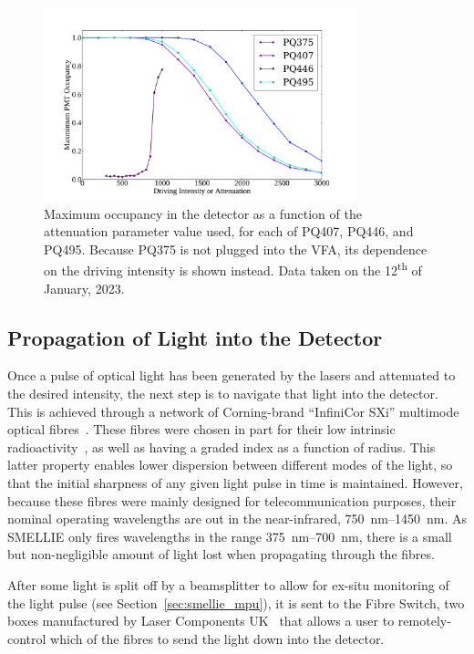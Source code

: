 \begin{figure}
    \centering
    \includegraphics[width=0.8\textwidth]{3_SMELLIEHardware/images/smellie_intensity_scan_new.pdf}
    \caption[Maximum occupancy in the detector as a function of the attenuation parameter value used]
    {Maximum occupancy in the detector as a function of the attenuation parameter value used, for each of PQ407, PQ446, and PQ495. Because PQ375 is not plugged into the VFA, its dependence on the driving intensity is shown instead. Data taken on the 12\textsuperscript{th} of January, 2023.}
    \label{fig:pq_new_intensity_dependence}
\end{figure}

\subsection{Propagation of Light into the Detector}\label{sec:smellie_fibres}
Once a pulse of optical light has been generated by the lasers and attenuated to the desired intensity, the next step is to navigate that light into the detector. This is achieved through a network of Corning-brand ``InfiniCor SXi'' multimode optical fibres~\cite{}. %
These fibres were chosen in part for their low intrinsic radioactivity~\cite{}, %
as well as having a graded index as a function of radius. This latter property enables lower dispersion between different modes of the light, so that the initial sharpness of any given light pulse in time is maintained. However, because these fibres were mainly designed for telecommunication purposes, their nominal operating wavelengths are out in the near-infrared, \SIrange{750}{1450}{\nm}. As SMELLIE only fires wavelengths in the range \SIrange{375}{700}{\nm}, there is a small but non-negligible amount of light lost when propagating through the fibres.

After some light is split off by a beamsplitter to allow for ex-situ monitoring of the light pulse (see Section~\ref{sec:smellie_mpu}), it is sent to the Fibre Switch, two boxes manufactured by Laser Components UK~\cite{} %
that allows a user to remotely-control which of the fibres to send the light down into the detector.

